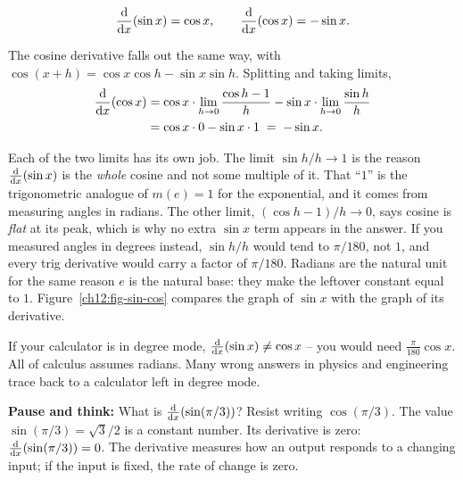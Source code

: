 \begin{theorem}
\label{ch12:thm-sincos}
\[
   \frac{\mathrm{d}}{\mathrm{d} x}\!\left(\sin x\right) = \cos x,
   \qquad
   \frac{\mathrm{d}}{\mathrm{d} x}\!\left(\cos x\right) = -\sin x.
\]
\end{theorem}

The cosine derivative falls out the same way, with
$\cos(x+h)=\cos x\cos h - \sin x\sin h$. Splitting and taking limits,
\begin{align*}
\frac{\mathrm{d}}{\mathrm{d} x}\!\left(\cos x\right)
&= \cos x\cdot\lim_{h\to0}\frac{\cos h-1}{h}
 - \sin x\cdot\lim_{h\to0}\frac{\sin h}{h} \\
&= \cos x\cdot 0 - \sin x\cdot 1 \;=\; -\sin x.
\end{align*}

\begin{happeningbox}
Each of the two limits has its own job. The limit
$\sin h/h\to 1$ is the reason $\frac{\mathrm{d}}{\mathrm{d} x}\!\left(\sin x\right)$ is the \emph{whole} cosine and not
some multiple of it. That ``$1$'' is the trigonometric analogue of $m(e)=1$ for
the exponential, and it comes from measuring angles in radians. The other
limit, $(\cos h-1)/h\to 0$, says cosine is \emph{flat} at its peak, which is
why no extra $\sin x$ term appears in the answer. If you measured angles in
degrees instead, $\sin h/h$ would tend to $\pi/180$, not $1$, and every trig
derivative would carry a factor of $\pi/180$. Radians are the natural unit for
the same reason $e$ is the natural base: they make the leftover constant
equal to $1$. Figure~\ref{ch12:fig-sin-cos} compares the graph of $\sin x$
with the graph of its derivative.
\end{happeningbox}

\begin{trapbox}
If your calculator is in degree mode,
$\frac{\mathrm{d}}{\mathrm{d} x}\!\left(\sin x\right)\neq\cos x$ -- you would need $\frac{\pi}{180}\cos x$. All of
calculus assumes radians. Many wrong answers in physics
and engineering trace back to a calculator left in degree mode.
\end{trapbox}

\begin{recoverybox}
\textbf{Pause and think:} What is $\frac{\mathrm{d}}{\mathrm{d} x}\!\left(\sin(\pi/3)\right)$?
Resist writing $\cos(\pi/3)$. The value $\sin(\pi/3) = \sqrt{3}/2$ is a constant number.
Its derivative is zero: $\frac{\mathrm{d}}{\mathrm{d} x}\!\left(\sin(\pi/3)\right) = 0$. The derivative measures how an output
responds to a changing input; if the input is fixed, the rate of change is zero.
\end{recoverybox}

